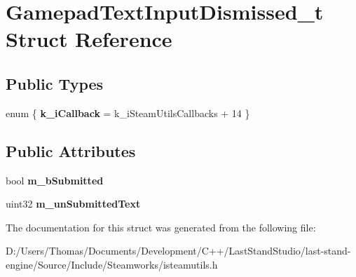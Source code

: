 \hypertarget{structGamepadTextInputDismissed__t}{}\section{Gamepad\+Text\+Input\+Dismissed\+\_\+t Struct Reference}
\label{structGamepadTextInputDismissed__t}
\subsection*{Public Types}
\begin{DoxyCompactItemize}
\item 
\hypertarget{structGamepadTextInputDismissed__t_a37bd2a1a9835549a06b5a713ed75af4e}{}enum \{ {\bfseries k\+\_\+i\+Callback} = k\+\_\+i\+Steam\+Utils\+Callbacks + 14
 \}\label{structGamepadTextInputDismissed__t_a37bd2a1a9835549a06b5a713ed75af4e}

\end{DoxyCompactItemize}
\subsection*{Public Attributes}
\begin{DoxyCompactItemize}
\item 
\hypertarget{structGamepadTextInputDismissed__t_af72d1b82ef1c40e3b7ae3a47e8671bbc}{}bool {\bfseries m\+\_\+b\+Submitted}\label{structGamepadTextInputDismissed__t_af72d1b82ef1c40e3b7ae3a47e8671bbc}

\item 
\hypertarget{structGamepadTextInputDismissed__t_a0de070797255efd689ddac9b967aaecc}{}uint32 {\bfseries m\+\_\+un\+Submitted\+Text}\label{structGamepadTextInputDismissed__t_a0de070797255efd689ddac9b967aaecc}

\end{DoxyCompactItemize}


The documentation for this struct was generated from the following file\+:\begin{DoxyCompactItemize}
\item 
D\+:/\+Users/\+Thomas/\+Documents/\+Development/\+C++/\+Last\+Stand\+Studio/last-\/stand-\/engine/\+Source/\+Include/\+Steamworks/isteamutils.\+h\end{DoxyCompactItemize}
